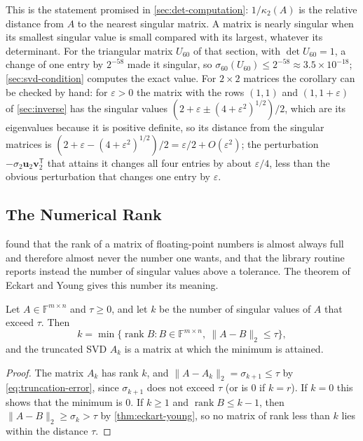 This is the statement promised in \cref{sec:det-computation}: $1/\kappa_2(A)$ is the relative distance from $A$ to the nearest singular matrix. A matrix is nearly singular when its smallest singular value is small compared with its largest, whatever its determinant. For the triangular matrix $U_{60}$ of that section, with $\det U_{60}=1$, a change of one entry by $2^{-58}$ made it singular, so $\sigma_{60}(U_{60})\le2^{-58}\approx3.5\times10^{-18}$; \cref{sec:svd-condition} computes the exact value. For $2\times2$ matrices the corollary can be checked by hand: for $\varepsilon>0$ the matrix with the rows $(1,1)$ and $(1,1+\varepsilon)$ of \cref{sec:inverse} has the singular values $(2+\varepsilon\pm(4+\varepsilon^2)^{1/2})/2$, which are its eigenvalues because it is positive definite, so its distance from the singular matrices is $(2+\varepsilon-(4+\varepsilon^2)^{1/2})/2=\varepsilon/2+O(\varepsilon^2)$; the perturbation $-\sigma_2\mathbf u_2\mathbf v_2^{\mathsf T}$ that attains it changes all four entries by about $\varepsilon/4$, less than the obvious perturbation that changes one entry by $\varepsilon$.

\subsection{The Numerical Rank}

 found that the rank of a matrix of floating-point numbers is almost always full and therefore almost never the number one wants, and that the library routine  reports instead the number of singular values above a tolerance. The theorem of Eckart and Young gives this number its meaning.

\begin{proposition}
\label{prop:numerical-rank}
Let $A\in\mathbb F^{m\times n}$ and $\tau\ge0$, and let $k$ be the number of singular values of $A$ that exceed $\tau$. Then
\[
k=\min\bigl\{\operatorname{rank}B:B\in\mathbb F^{m\times n},\ \|A-B\|_2\le\tau\bigr\},
\]
and the truncated SVD $A_k$ is a matrix at which the minimum is attained.
\end{proposition}

\begin{proof}
The matrix $A_k$ has rank $k$, and $\|A-A_k\|_2=\sigma_{k+1}\le\tau$ by \eqref{eq:truncation-error}, since $\sigma_{k+1}$ does not exceed $\tau$ (or is $0$ if $k=r$). If $k=0$ this shows that the minimum is $0$. If $k\ge1$ and $\operatorname{rank}B\le k-1$, then $\|A-B\|_2\ge\sigma_k>\tau$ by \cref{thm:eckart-young}, so no matrix of rank less than $k$ lies within the distance $\tau$.
\end{proof}

